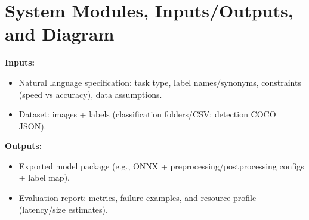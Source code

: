 \documentclass[10pt]{article}
\begin{document}
\section*{System Modules, Inputs/Outputs, and Diagram}
\textbf{Inputs:}
\begin{itemize}
  \item Natural language specification: task type, label names/synonyms, constraints (speed vs accuracy), data assumptions.
  \item Dataset: images + labels (classification folders/CSV; detection COCO JSON).
\end{itemize}

\textbf{Outputs:}
\begin{itemize}
  \item Exported model package (e.g., ONNX + preprocessing/postprocessing configs + label map).
  \item Evaluation report: metrics, failure examples, and resource profile (latency/size estimates).
\end{itemize}
\end{document}

